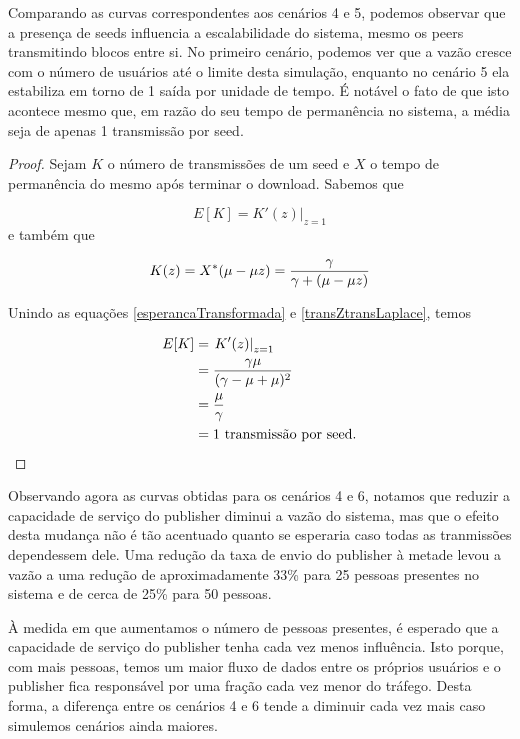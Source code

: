 \documentclass[a4paper,10pt]{article}
\begin{document}
Comparando as curvas correspondentes aos cenários 4 e 5, podemos observar que a presença de seeds influencia a escalabilidade do sistema, mesmo os peers transmitindo blocos entre si. No primeiro cenário, podemos ver que a vazão cresce com o número de usuários até o limite desta simulação, enquanto no cenário 5 ela estabiliza em torno de 1 saída por unidade de tempo. É notável o fato de que isto acontece mesmo que, em razão do seu tempo de permanência no sistema, a média seja de apenas 1 transmissão por seed.

\begin{proof}

Sejam $K$ o número de transmissões de um seed e $X$ o tempo de permanência do mesmo após terminar o download. Sabemos que

\begin{equation}\label{esperancaTransformada}
	E[K] =\left. K'(z) \right |_{z = 1}
\end{equation}
e também que

\begin{equation}\label{transZtransLaplace}
	K(z) = X^*(\mu - \mu z) = {{\gamma} \over {\gamma + (\mu - \mu z)}}
\end{equation}

Unindo as equações \ref{esperancaTransformada} e \ref{transZtransLaplace}, temos

\begin{align}
	E[K] &= \left. K'(z) \right |_{z = 1} \\
	&= {{\gamma \mu} \over {(\gamma - \mu + \mu)^2}} \\
	&= {{\mu} \over {\gamma}} \\
	&= 1 \text{ transmissão por seed.}
\end{align}
\end{proof}

Observando agora as curvas obtidas para os cenários 4 e 6, notamos que reduzir a capacidade de serviço do publisher diminui a vazão do sistema, mas que o efeito desta mudança não é tão acentuado quanto se esperaria caso todas as tranmissões dependessem dele. Uma redução da taxa de envio do publisher à metade levou a vazão a uma redução de aproximadamente 33\% para 25 pessoas presentes no sistema e de cerca de 25\% para 50 pessoas.

À medida em que aumentamos o número de pessoas presentes, é esperado que a capacidade de serviço do publisher tenha cada vez menos influência. Isto porque, com mais pessoas, temos um maior fluxo de dados entre os próprios usuários e o publisher fica responsável por uma fração cada vez menor do tráfego. Desta forma, a diferença entre os cenários 4 e 6 tende a diminuir cada vez mais caso simulemos cenários ainda maiores.
\end{document}
